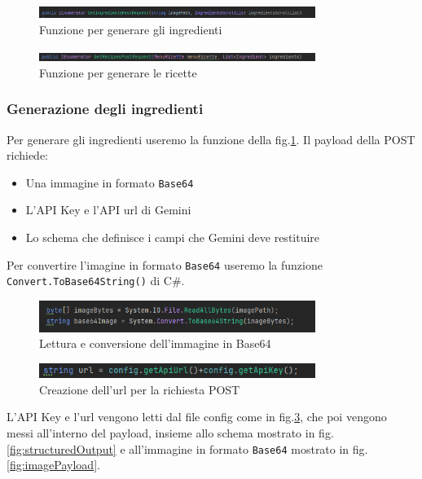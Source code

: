 \begin{figure}[H]
    \centering
    \includegraphics[width=0.8\textwidth,height=\textheight,keepaspectratio]{figures/chapter_1/GetIngredientsPostRequest.png}
    \caption{Funzione per generare gli ingredienti}
    \label{fig:getIngredientsPostRequest}
\end{figure}

\begin{figure}[H]
    \centering
    \includegraphics[width=0.8\textwidth,height=\textheight,keepaspectratio]{figures/chapter_1/GetRecipesPostRequest.png}
    \caption{Funzione per generare le ricette}
    \label{fig:getRecipesPostRequest}
\end{figure}

\subsubsection{Generazione degli ingredienti}
Per generare gli ingredienti useremo la funzione della fig.\ref{fig:getIngredientsPostRequest}. Il payload della  POST richiede: 
\begin{itemize}
    \item Una immagine in formato \texttt{Base64}
    \item L'API Key e l'API url di Gemini
    \item Lo schema che definisce i campi che Gemini deve restituire
\end{itemize}

Per convertire l'imagine in formato \texttt{Base64} useremo la funzione \texttt{Convert.ToBase64String()} di C\#. 
\begin{figure}[H]
    \centering
    \includegraphics[width=0.8\textwidth,height=\textheight,keepaspectratio]{figures/chapter_1/base64.png}
    \caption{Lettura e conversione dell'immagine in Base64}
\end{figure}
\begin{figure}[H]
    \centering
    \includegraphics[width=0.8\textwidth,height=\textheight,keepaspectratio]{figures/chapter_1/APIkey.png}
    \caption{Creazione dell'url per la richiesta POST}
    \label{fig:apiKey}
\end{figure}
L'API Key e l'url vengono letti dal file config come in fig.\ref{fig:apiKey}, che poi vengono messi all'interno del payload, insieme allo schema mostrato in fig.\ref{fig:structuredOutput} e all'immagine in formato \texttt{Base64} mostrato in fig.\ref{fig:imagePayload}.

